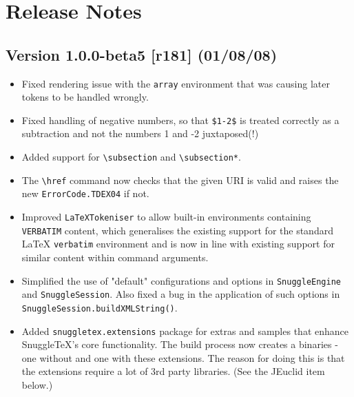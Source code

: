 
\section*{Release Notes}

\subsection*{Version 1.0.0-beta5 [r181] (01/08/08)}

\begin{itemize}

  \item Fixed rendering issue with the \verb|array| environment that was
  causing later tokens to be handled wrongly.

  \item Fixed handling of negative numbers, so that \verb|$1-2$| is treated
  correctly as a subtraction and not the numbers 1 and -2 juxtaposed(!)

  \item Added support for \verb|\subsection| and \verb|\subsection*|.

  \item The \verb|\href| command now checks that the given URI is valid and
  raises the new \verb|ErrorCode.TDEX04| if not.

  \item Improved \verb|LaTeXTokeniser| to allow built-in environments
  containing \verb|VERBATIM| content, which generalises the existing support
  for the standard LaTeX \verb|verbatim| environment and is now in line with
  existing support for similar content within command arguments.

  \item Simplified the use of "default" configurations and options in
  \verb|SnuggleEngine| and \verb|SnuggleSession|. Also fixed a bug in the
  application of such options in \verb|SnuggleSession.buildXMLString()|.

  \item Added \verb|snuggletex.extensions| package for extras and samples
  that enhance SnuggleTeX's core functionality. The build process now creates
  a binaries - one without and one with these extensions. The reason for doing
  this is that the extensions require a lot of 3rd party libraries. (See the
  JEuclid item below.)


\end{itemize}

